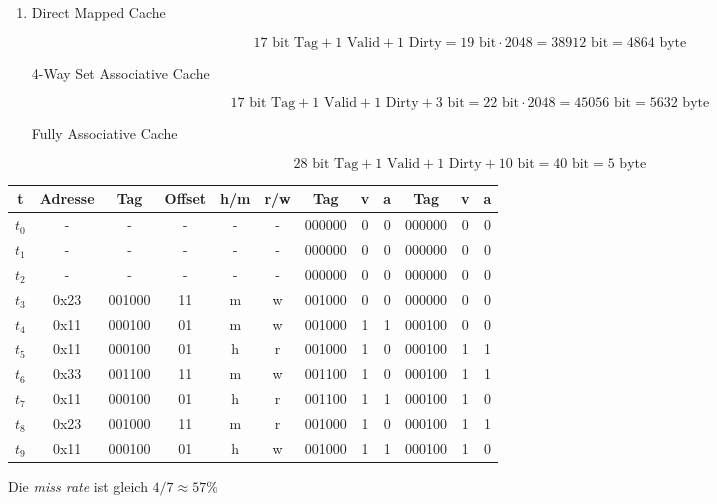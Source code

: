 \documentclass[a4paper, 12pt, margins=2cm]{homework}
\begin{document}
\begin{solution}
\begin{enumerate}[label=(\alph*)]
    \item \hfill
      \begin{description}
        \item[Direct Mapped Cache]\hfill 
          \[ 17 \text{ bit Tag} + 1 \text{ Valid} + 1 \text{ Dirty} = 19 \text{ bit} \cdot 2048 = 38912 \text{ bit} = 4864\text{ byte} \]

        \item[4-Way Set Associative Cache]\hfill
          \[ 17 \text{ bit Tag} + 1 \text{ Valid} + 1 \text{ Dirty} + 3 \text{ bit} = 22 \text{ bit} \cdot 2048 = 45056 \text{ bit} = 5632\text{ byte} \]

        \item[Fully Associative Cache]
          \[ 28 \text{ bit Tag} + 1 \text{ Valid} + 1 \text{ Dirty} + 10\text{ bit} = 40 \text{ bit} = 5\text{ byte} \]
      \end{description}
  \end{enumerate}
\end{solution}


\begin{problem}
  
\end{problem}
\begin{solution} \hfill
  \begin{center}
    \begin{tabular}{|c|c|c|c|c|c||c|c|c||c|c|c|}
      \hline
      t     & Adresse & Tag    & Offset & h/m & r/w & Tag    & v & a & Tag    & v & a \\ \hline \hline
      $t_0$ & -       & -      & -      & -   & -   & 000000 & 0 & 0 & 000000 & 0 & 0 \\ \hline
      $t_1$ & -       & -      & -      & -   & -   & 000000 & 0 & 0 & 000000 & 0 & 0 \\ \hline
      $t_2$ & -       & -      & -      & -   & -   & 000000 & 0 & 0 & 000000 & 0 & 0 \\ \hline
      $t_3$ & 0x23    & 001000 & 11     & m   & w   & 001000 & 0 & 0 & 000000 & 0 & 0 \\ \hline
      $t_4$ & 0x11    & 000100 & 01     & m   & w   & 001000 & 1 & 1 & 000100 & 0 & 0 \\ \hline
      $t_5$ & 0x11    & 000100 & 01     & h   & r   & 001000 & 1 & 0 & 000100 & 1 & 1 \\ \hline
      $t_6$ & 0x33    & 001100 & 11     & m   & w   & 001100 & 1 & 0 & 000100 & 1 & 1 \\ \hline
      $t_7$ & 0x11    & 000100 & 01     & h   & r   & 001100 & 1 & 1 & 000100 & 1 & 0 \\ \hline
      $t_8$ & 0x23    & 001000 & 11     & m   & r   & 001000 & 1 & 0 & 000100 & 1 & 1 \\ \hline
      $t_9$ & 0x11    & 000100 & 01     & h   & w   & 001000 & 1 & 1 & 000100 & 1 & 0 \\ \hline
    \end{tabular}
  \end{center}

  Die \emph{miss rate} ist gleich $ 4/7 \approx 57\%$
\end{solution}
\end{document}
